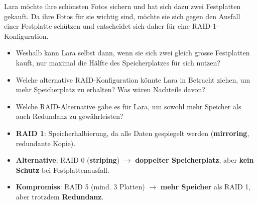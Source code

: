 \begin{myexercise}
    Lara möchte ihre schönsten Fotos sichern und hat sich dazu zwei Festplatten gekauft. Da ihre Fotos für sie wichtig sind, möchte sie sich gegen den Ausfall einer Festplatte schützen und entscheidet sich daher für eine \acrshort{RAID}-1-Konfiguration.

    \begin{itemize}
        \item Weshalb kann Lara selbst dann, wenn sie sich zwei gleich grosse Festplatten kauft, nur maximal die Hälfte des Speicherplatzes für sich nutzen?
        \item Welche alternative \acrshort{RAID}-Konfiguration könnte Lara in Betracht ziehen, um mehr Speicherplatz zu erhalten? Was wären Nachteile davon?
        \item Welche \acrshort{RAID}-Alternative gäbe es für Lara, um sowohl mehr Speicher als auch Redundanz zu gewährleisten?
    \end{itemize}


    \begin{myanswer}
        \begin{itemize}
            \item \textbf{\gls{RAID} 1}: Speicherhalbierung, da alle Daten gespiegelt werden (\textbf{mirroring}, redundante Kopie).
            \item \textbf{Alternative}: \gls{RAID} 0 (\textbf{striping}) $\rightarrow$ \textbf{doppelter Speicherplatz}, aber \textbf{kein Schutz} bei Festplattenausfall.
            \item \textbf{Kompromiss}: \gls{RAID} 5 (mind. 3 Platten) $\rightarrow$ \textbf{mehr Speicher} als \gls{RAID} 1, aber trotzdem \textbf{Redundanz}.
        \end{itemize}
    \end{myanswer}
\end{myexercise}

